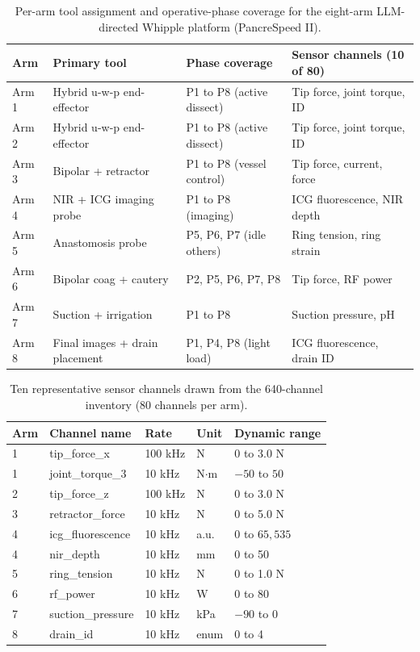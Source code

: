 \begin{table}[htbp]
\centering
\footnotesize
\caption{Per-arm tool assignment and operative-phase coverage for the eight-arm LLM-directed Whipple platform (PancreSpeed II).}
\label{tab:arms}
\begin{tabularx}{\textwidth}{L{1.2cm} L{4.9cm} L{4.0cm} Y}
\toprule
\textbf{Arm} & \textbf{Primary tool} & \textbf{Phase coverage} & \textbf{Sensor channels (10 of 80)} \\
\midrule
Arm 1 & Hybrid u-w-p end-effector & P1 to P8 (active dissect) & Tip force, joint torque, ID \\
Arm 2 & Hybrid u-w-p end-effector & P1 to P8 (active dissect) & Tip force, joint torque, ID \\
Arm 3 & Bipolar + retractor & P1 to P8 (vessel control) & Tip force, current, force \\
Arm 4 & NIR + ICG imaging probe & P1 to P8 (imaging) & ICG fluorescence, NIR depth \\
Arm 5 & Anastomosis probe & P5, P6, P7 (idle others) & Ring tension, ring strain \\
Arm 6 & Bipolar coag + cautery & P2, P5, P6, P7, P8 & Tip force, RF power \\
Arm 7 & Suction + irrigation & P1 to P8 & Suction pressure, pH \\
Arm 8 & Final images + drain placement & P1, P4, P8 (light load) & ICG fluorescence, drain ID \\
\bottomrule
\end{tabularx}
\end{table}

\begin{table}[htbp]
\centering
\footnotesize
\caption{Ten representative sensor channels drawn from the 640-channel inventory (80 channels per arm).}
\label{tab:sensors}
\begin{tabularx}{\textwidth}{L{1.0cm} L{3.8cm} L{3cm} L{2.4cm} Y}
\toprule
\textbf{Arm} & \textbf{Channel name} & \textbf{Rate} & \textbf{Unit} & \textbf{Dynamic range} \\
 & tip\_force\_x & 100 kHz & N & 0 to 3.0 N \\
1 & joint\_torque\_3 & 10 kHz & N$\cdot$m & $-50$ to $50$ \\
2 & tip\_force\_z & 100 kHz & N & 0 to 3.0 N \\
3 & retractor\_force & 10 kHz & N & 0 to 5.0 N \\
4 & icg\_fluorescence & 10 kHz & a.u. & 0 to $65{,}535$ \\
4 & nir\_depth & 10 kHz & mm & 0 to 50 \\
5 & ring\_tension & 10 kHz & N & 0 to 1.0 N \\
6 & rf\_power & 10 kHz & W & 0 to 80 \\
7 & suction\_pressure & 10 kHz & kPa & $-90$ to 0 \\
8 & drain\_id & 10 kHz & enum & 0 to 4 \\
\bottomrule
\end{tabularx}
\end{table}

